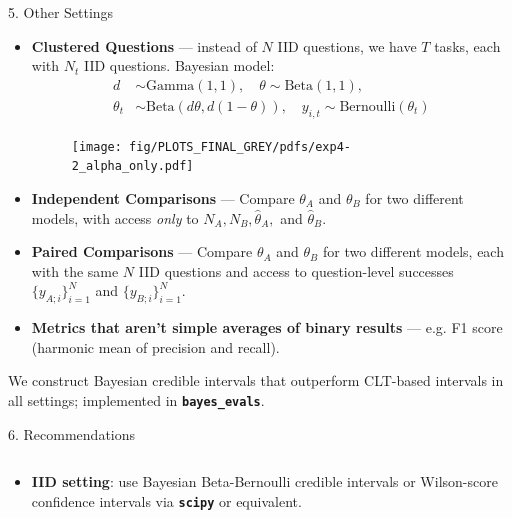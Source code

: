 \documentclass[final]{beamer}
\newlength{\colwidth}
\begin{document}
\begin{frame}[fragile]
\begin{columns}[t]
\begin{column}{\colwidth}
\begin{exampleblock}{5. Other Settings}
    \begin{itemize}
      \item \textbf{Clustered Questions} --- instead of $N$ IID questions, we have $T$ tasks, each with $N_t$ IID questions. Bayesian model:
      $$
        \begin{aligned}
        d &\sim \text{Gamma}(1, 1), \quad 
        \theta \sim \text{Beta}(1, 1), \quad \\
        \theta_t &\sim \text{Beta}(d \theta, d (1-\theta)), \quad
        y_{i,t} \sim \text{Bernoulli}(\theta_t)
        \end{aligned}
      $$
    \begin{figure}
      \centering
      \texttt{[image: fig/PLOTS\_FINAL\_GREY/pdfs/exp4-2\_alpha\_only.pdf]}
    \end{figure}
      \item \textbf{Independent Comparisons} --- Compare $\theta_A$ and $\theta_B$ for two different models, with access \textit{only} to $N_A, N_B, \hat{\theta}_A,$ and $\hat{\theta}_B$.
      \item \textbf{Paired Comparisons} --- Compare $\theta_A$ and $\theta_B$ for two different models, each with the same $N$ IID questions and access to question-level successes $\{y_{A;i}\}_{i=1}^N$ and $\{y_{B;i}\}_{i=1}^N$.
      \item \textbf{Metrics that aren't simple averages of binary results} --- e.g. F1 score (harmonic mean of precision and recall).    
    \end{itemize}

    We construct Bayesian credible intervals that outperform CLT-based intervals in all settings; implemented in \textbf{\texttt{bayes\_evals}}.

  \end{exampleblock}

  \begin{alertblock}{6. Recommendations}

    

    \begin{columns}
      \begin{column}{0.7\textwidth}
        \begin{itemize}
          \item \textbf{IID setting}: use Bayesian Beta-Bernoulli credible intervals or Wilson-score confidence intervals via \textbf{\texttt{scipy}} or equivalent.
          

\end{itemize}
\end{column}
\end{columns}
\end{alertblock}
\end{column}
\end{columns}
\end{frame}
\end{document}
